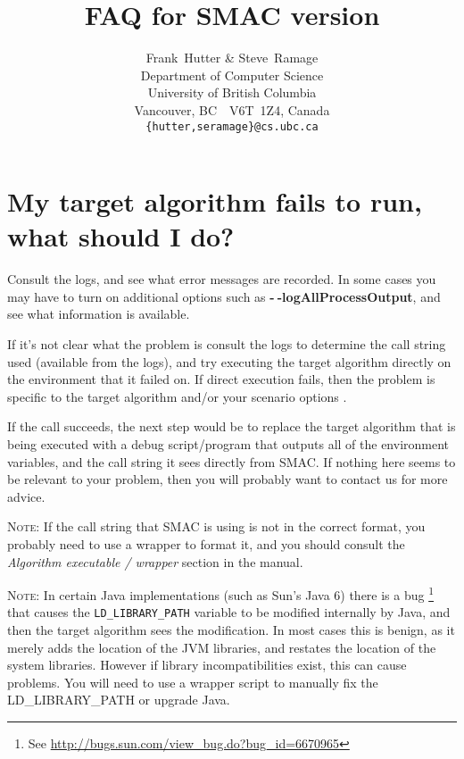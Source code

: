 \documentclass[11pt,letterpaper,oneside]{article}
\begin{document}
\title{FAQ for SMAC version }

\author{
Frank~Hutter \& Steve~Ramage\\
Department of Computer Science\\
University of British Columbia\\
Vancouver, BC\ \ V6T~1Z4, Canada\\
\texttt{\{hutter,seramage\}@cs.ubc.ca}
}



\maketitle

\renewcommand*\contentsname{FAQ}
\tableofcontents


\section{My target algorithm fails to run, what should I do?}

Consult the logs, and see what error messages are recorded. In some cases you may have to turn on additional options such as \textbf{-$~\!$-logAllProcessOutput}, and see what information is available.

If it's not clear what the problem is consult the logs to determine the call string used (available from the logs), and try executing the target algorithm directly on the environment that it failed on. If direct execution fails, then the problem is specific to the target algorithm and/or your scenario options . 

If the call succeeds, the next step would be to replace the target algorithm that is being executed with a debug script/program that outputs all of the environment variables, and the call string it sees directly from SMAC. If nothing here seems to be relevant to your problem, then you will probably want to contact us for more advice.

\textsc{Note:} If the call string that SMAC is using is not in the correct format, you probably need to use a wrapper to format it, and you should consult the \emph{Algorithm executable / wrapper} section in the manual.

\textsc{Note:} In certain Java implementations (such as Sun's Java 6) there is a bug \footnote{See \url{http://bugs.sun.com/view_bug.do?bug_id=6670965}} that causes the \texttt{LD\_LIBRARY\_PATH} variable to be modified internally by Java, and then the target algorithm sees the modification. In most cases this is benign, as it merely adds the location of the JVM libraries, and restates the location of the system libraries. However if library incompatibilities exist, this can cause problems. You will need to use a wrapper script to manually fix the LD\_LIBRARY\_PATH or upgrade Java.
\end{document}
